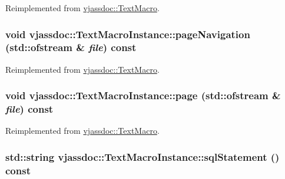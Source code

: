 Reimplemented from \hyperlink{classvjassdoc_1_1TextMacro_816bdd2b838a4f1148ea17e5723e8577}{vjassdoc::TextMacro}.\hypertarget{classvjassdoc_1_1TextMacroInstance_2bc8e5c94f5a74795d0c2d8137522d89}{
\subsubsection{\setlength{\rightskip}{0pt plus 5cm}void vjassdoc::TextMacroInstance::pageNavigation (std::ofstream \& {\em file}) const}}
\label{classvjassdoc_1_1TextMacroInstance_2bc8e5c94f5a74795d0c2d8137522d89}




Reimplemented from \hyperlink{classvjassdoc_1_1TextMacro_d3ad5fe5300492db3d1aaf250d9b2a4b}{vjassdoc::TextMacro}.\hypertarget{classvjassdoc_1_1TextMacroInstance_4785937fa62c12f3586276a2d5dcbe52}{
\subsubsection{\setlength{\rightskip}{0pt plus 5cm}void vjassdoc::TextMacroInstance::page (std::ofstream \& {\em file}) const}}
\label{classvjassdoc_1_1TextMacroInstance_4785937fa62c12f3586276a2d5dcbe52}




Reimplemented from \hyperlink{classvjassdoc_1_1TextMacro_3336cdf9ad953dbd44b38fb14a2f73fa}{vjassdoc::TextMacro}.\hypertarget{classvjassdoc_1_1TextMacroInstance_7659e7ac5ff7547dfc526a4a7ff152b5}{
\subsubsection{\setlength{\rightskip}{0pt plus 5cm}std::string vjassdoc::TextMacroInstance::sqlStatement () const}}
\label{classvjassdoc_1_1TextMacroInstance_7659e7ac5ff7547dfc526a4a7ff152b5}




